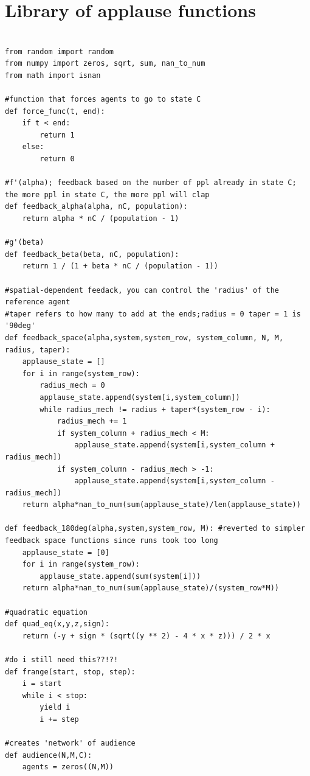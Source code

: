 \section{Library of applause functions}
\label{apndx:codelib}
\begin{lstlisting}

from random import random
from numpy import zeros, sqrt, sum, nan_to_num
from math import isnan

#function that forces agents to go to state C
def force_func(t, end):
    if t < end:
        return 1
    else:
        return 0

#f'(alpha); feedback based on the number of ppl already in state C; the more ppl in state C, the more ppl will clap
def feedback_alpha(alpha, nC, population):
    return alpha * nC / (population - 1)
    
#g'(beta)
def feedback_beta(beta, nC, population):
    return 1 / (1 + beta * nC / (population - 1))
       
#spatial-dependent feedack, you can control the 'radius' of the reference agent
#taper refers to how many to add at the ends;radius = 0 taper = 1 is '90deg'    
def feedback_space(alpha,system,system_row, system_column, N, M, radius, taper):
    applause_state = []
    for i in range(system_row):
        radius_mech = 0
        applause_state.append(system[i,system_column])
        while radius_mech != radius + taper*(system_row - i):
            radius_mech += 1
            if system_column + radius_mech < M:
                applause_state.append(system[i,system_column + radius_mech])
            if system_column - radius_mech > -1:
                applause_state.append(system[i,system_column - radius_mech])
    return alpha*nan_to_num(sum(applause_state)/len(applause_state))
    
def feedback_180deg(alpha,system,system_row, M): #reverted to simpler feedback space functions since runs took too long
    applause_state = [0]
    for i in range(system_row):
        applause_state.append(sum(system[i]))
    return alpha*nan_to_num(sum(applause_state)/(system_row*M))    

#quadratic equation    
def quad_eq(x,y,z,sign):
    return (-y + sign * (sqrt((y ** 2) - 4 * x * z))) / 2 * x

#do i still need this??!?!
def frange(start, stop, step):
    i = start
    while i < stop:
        yield i
        i += step
   
#creates 'network' of audience        
def audience(N,M,C):
    agents = zeros((N,M))
    

\end{lstlisting}

